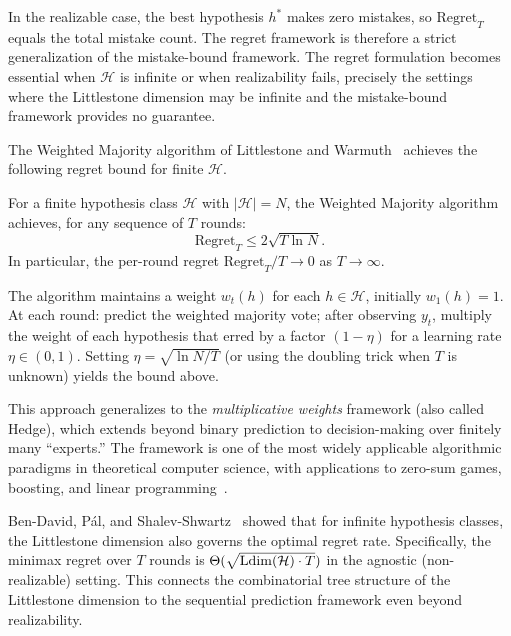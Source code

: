 \begin{remark}
\label{rmk:mistake-vs-regret}
In the realizable case, the best hypothesis $h^*$ makes zero mistakes, so $\mathrm{Regret}_T$ equals the total mistake count. The regret framework is therefore a strict generalization of the mistake-bound framework. The regret formulation becomes essential when $\mathcal{H}$ is infinite or when realizability fails, precisely the settings where the Littlestone dimension may be infinite and the mistake-bound framework provides no guarantee.
\end{remark}

The Weighted Majority algorithm of Littlestone and Warmuth~\cite{Littlestone1988} achieves the following regret bound for finite $\mathcal{H}$.

\begin{thm}
\label{thm:weighted-majority}
For a finite hypothesis class $\mathcal{H}$ with $|\mathcal{H}| = N$, the Weighted Majority algorithm achieves, for any sequence of $T$ rounds:
\[
\mathrm{Regret}_T \leq 2\sqrt{T \ln N}.
\]
In particular, the per-round regret $\mathrm{Regret}_T / T \to 0$ as $T \to \infty$.
\end{thm}

The algorithm maintains a weight $w_t(h)$ for each $h \in \mathcal{H}$, initially $w_1(h) = 1$. At each round: predict the weighted majority vote; after observing $y_t$, multiply the weight of each hypothesis that erred by a factor $(1 - \eta)$ for a learning rate $\eta \in (0, 1)$. Setting $\eta = \sqrt{\ln N / T}$ (or using the doubling trick when $T$ is unknown) yields the bound above.

This approach generalizes to the \emph{multiplicative weights} framework (also called Hedge), which extends beyond binary prediction to decision-making over finitely many ``experts.'' The framework is one of the most widely applicable algorithmic paradigms in theoretical computer science, with applications to zero-sum games, boosting, and linear programming~\cite{ShalevShwartzBenDavid2014}.

\begin{remark}
\label{rmk:regret-ldim}
Ben-David, P\'al, and Shalev-Shwartz~\cite{BenDavidPalShalevShwartz2009} showed that for infinite hypothesis classes, the Littlestone dimension also governs the optimal regret rate. Specifically, the minimax regret over $T$ rounds is $\Theta(\sqrt{\mathrm{Ldim}(\mathcal{H}) \cdot T})$ in the agnostic (non-realizable) setting. This connects the combinatorial tree structure of the Littlestone dimension to the sequential prediction framework even beyond realizability.
\end{remark}

